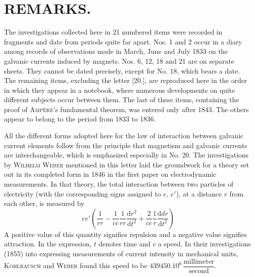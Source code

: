 \section*{REMARKS.}
\par\nopagebreak[4]\smallskip\noindent\makebox[\linewidth][c]{\rule{.08\linewidth}{.35pt}}\par

The investigations collected here in 21 numbered items were recorded in fragments and date from periods quite far apart. Nos. 1 and 2 occur in a diary among records of observations made in March, June and July 1833 on the galvanic currents induced by magnets. Nos. 6, 12, 18 and 21 are on separate sheets. They cannot be dated precisely, except for No. 18, which bears a date. The remaining items, excluding the letter [20.], are reproduced here in the order in which they appear in a notebook, where numerous developments on quite different subjects occur between them. The last of these items, containing the proof of \textsc{Ampère}'s fundamental theorem, was entered only after 1843. The others appear to belong to the period from 1833 to 1836.

All the different forms adopted here for the law of interaction between galvanic current elements follow from the principle that magnetism and galvanic currents are interchangeable, which is emphasized especially in No. 20. The investigations by \textsc{Wilhelm Weber} mentioned in this letter laid the groundwork for a theory set out in its completed form in 1846 in the first paper on electrodynamic measurements. In that theory, the total interaction between two particles of electricity (with the corresponding signs assigned to $e$, $e'$), at a distance $r$ from each other, is measured by
\[
ee'\left(\frac1{rr}-\frac1{cc}\frac1{rr}\frac{\mathrm dr^2}{\mathrm dt^2}+\frac2{cc}\frac1r\frac{\mathrm ddr}{\mathrm dt^2}\right)
\]
A positive value of this quantity signifies repulsion and a negative value signifies attraction. In the expression, $t$ denotes time and $c$ a speed. In their investigations (1855) into expressing measurements of current intensity in mechanical units, \textsc{Kohlrausch} and \textsc{Weber} found this speed to be $439450.10^6\,\dfrac{\text{millimeter}}{\text{second}}$.


